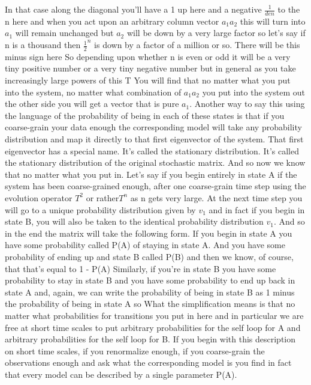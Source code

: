 \documentclass[]{article}
\begin{document}
In that case along the diagonal
you'll have
a 1 up here and a negative $\frac{1}{den}$ to the n here
and when you act upon an
arbitrary column vector $a_1 a_2$
this will turn into $a_1$
will remain unchanged
but $a_2$ will be down by a very large factor
so let's say if n is a thousand
then $\frac{1}{2}^n$
is down by a factor of a million or so.
There will be this minus sign here
So depending upon whether n is even or odd
it will be a very tiny positive number
or a very tiny negative number
but in general as you take
increasingly large powers of this T
You will find that no matter what
you put into the system,
no matter what combination
of $a_1 a_2$ you put into the system
out the other side you will
get a vector that is pure $a_1$.
Another way to say this
using the language of the probability
of being in each of these states
is that if you
coarse-grain your data enough
the corresponding model will take
any probability distribution
and map it directly to that first
eigenvector of the system.
That first eigenvector has a special name.
It's called the stationary distribution.
It's called the stationary distribution
of the original stochastic matrix.
And so now
we know that no matter
what you put in.
Let's say if you begin entirely in state A
if the system has been coarse-grained enough,
after one coarse-grain time step
using the evolution operator $T^2$
or rather$T^n$ as n gets very large.
At the next time step you will go to a unique
probability distribution given by $v_1$
and in fact if you begin in state B,
you will also be taken
to the identical
probability distribution  $v_1$.
And so in the end
the matrix will take the following form.
If you begin in state A
you have some probability called P(A)
of staying in state A.
And you have some probability of ending up and state B
called P(B) and then we know, of course,
that that's equal to 1 - P(A)
Similarly, if you're in state B
you have some probability
to stay in state B
and you have some probability
to end up back in state A
and, again, we can write
the probability of being in state B
as 1 minus the probability
of being in state A
so
What the simplification means
is that no matter
what probabilities
for transitions you put in here
and in particular we are free
at short time scales to put arbitrary
probabilities for the self loop
for A and arbitrary probabilities
for the self loop for B.
If you begin with this description on short time scales,
if you renormalize enough,
if you coarse-grain the observations enough
and ask what the corresponding model is
you find in fact that every model can be
described by a single parameter P(A).
\end{document}
